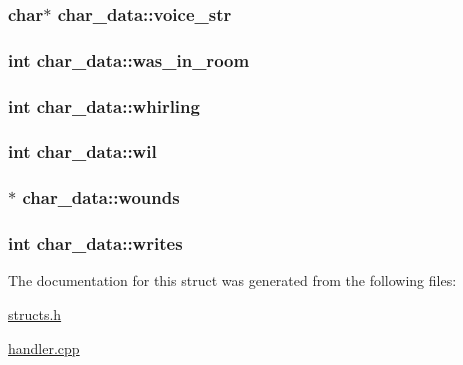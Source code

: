 \hypertarget{structchar__data_a81843e62203f585fab00a6644dd41508}{
\subsubsection[{voice\-\_\-str}]{\setlength{\rightskip}{0pt plus 5cm}char$\ast$ char\-\_\-data\-::voice\-\_\-str}}\label{structchar__data_a81843e62203f585fab00a6644dd41508}
\hypertarget{structchar__data_a9193210404d6d95668a5295e1827168b}{
\subsubsection[{was\-\_\-in\-\_\-room}]{\setlength{\rightskip}{0pt plus 5cm}int char\-\_\-data\-::was\-\_\-in\-\_\-room}}\label{structchar__data_a9193210404d6d95668a5295e1827168b}
\hypertarget{structchar__data_a0463aadabddfde6ba5f77a29af7f96b3}{
\subsubsection[{whirling}]{\setlength{\rightskip}{0pt plus 5cm}int char\-\_\-data\-::whirling}}\label{structchar__data_a0463aadabddfde6ba5f77a29af7f96b3}
\hypertarget{structchar__data_ad124ef3438b14c75c2e47a4a329643fd}{
\subsubsection[{wil}]{\setlength{\rightskip}{0pt plus 5cm}int char\-\_\-data\-::wil}}\label{structchar__data_ad124ef3438b14c75c2e47a4a329643fd}
\hypertarget{structchar__data_a7c4ecc2b53934e497083f7b634e711b1}{
\subsubsection[{wounds}]{$\ast$ char\-\_\-data\-::wounds}}\label{structchar__data_a7c4ecc2b53934e497083f7b634e711b1}
\hypertarget{structchar__data_a13b9829dae4a284cb0472f5804c7faf4}{
\subsubsection[{writes}]{\setlength{\rightskip}{0pt plus 5cm}int char\-\_\-data\-::writes}}\label{structchar__data_a13b9829dae4a284cb0472f5804c7faf4}


The documentation for this struct was generated from the following files\-:\begin{DoxyCompactItemize}
\item 
\hyperlink{structs_8h}{structs.\-h}\item 
\hyperlink{handler_8cpp}{handler.\-cpp}\end{DoxyCompactItemize}
